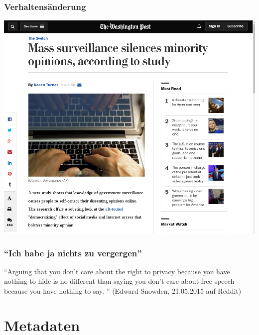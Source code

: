 \documentclass[12pt]{beamer}
\begin{document}
\begin{frame}
  \frametitle{Verhaltensänderung}
  \begin{center}
    \includegraphics[height=0.7\textheight]{img/verhalten.png}
  \end{center}
\end{frame}

\begin{frame}
    \frametitle{``Ich habe ja nichts zu vergergen''}
    \pause
    \begin{center}
      ``Arguing that you don't care about the right to privacy because you have nothing to hide is no different than saying you don't care about free speech because you have nothing to say. ''
      (Edward Snowden, 21.05.2015 auf Reddit)
    \end{center}
\end{frame}

\section{Metadaten}
\subsection{}
\end{document}

